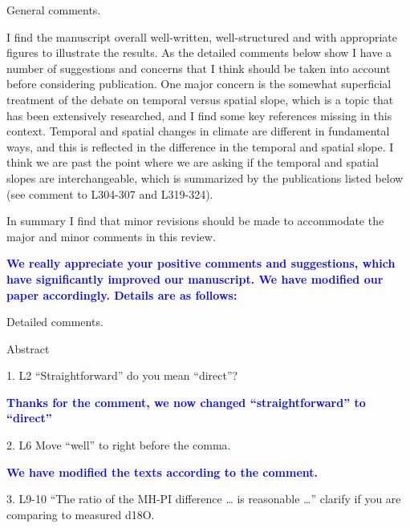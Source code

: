 \documentclass[gmd, manuscript]{copernicus}
\begin{document}
 \medskip
 


 \medskip

General comments.

 \medskip
 
I find the manuscript overall well-written, well-structured and with appropriate figures to illustrate the results. As the detailed comments below show I have a number of suggestions and concerns that I think should be taken into account before considering publication. One major concern is the somewhat superficial treatment of the debate on temporal versus spatial slope, which is a topic that has been extensively researched, and I find some key references missing in this context. Temporal and spatial changes in climate are different in fundamental ways, and this is reflected in the difference in the temporal and spatial slope. I think we are past the point where we are asking if the temporal and spatial slopes are interchangeable, which is summarized by the publications listed below (see comment to L304-307 and L319-324).

In summary I find that minor revisions should be made to accommodate the major and minor comments in this review.

 \textcolor{blue}{\textbf{We really appreciate your positive comments and suggestions, which have significantly improved our manuscript. We have modified our paper accordingly. Details are as follows: }}
 

Detailed comments.

 \medskip

Abstract

 \medskip

1. L2 “Straightforward” do you mean “direct”?

\medskip


\textcolor{blue}{\textbf{Thanks for the comment, we now changed “straightforward” to “direct”}}


\medskip

2. L6 Move “well” to right before the comma.
 \medskip
 
\textcolor{blue}{\textbf{We have modified the texts according to the comment.}}

 \medskip

3. L9-10 “The ratio of the MH-PI difference … is reasonable …” clarify if you are comparing to measured d18O.
\end{document}
